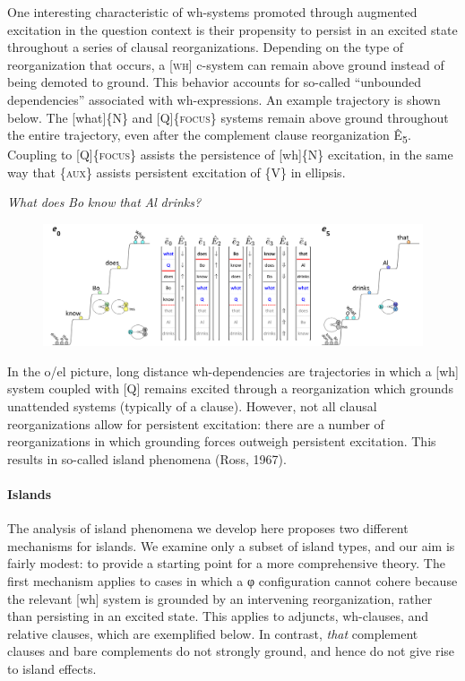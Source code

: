  One interesting characteristic of wh-systems promoted through augmented excitation in the question context is their propensity to persist in an excited state throughout a series of clausal reorganizations. Depending on the type of reorganization that occurs, a [\textsc{wh}] c-system can remain above ground instead of being demoted to ground. This behavior accounts for so-called “unbounded dependencies” associated with wh-expressions. An example trajectory is shown below. The [what]\{N\} and [Q]\{\textsc{focus}\} systems remain above ground throughout the entire trajectory, even after the complement clause reorganization Ê\textsubscript{5}. Coupling to  [Q]\{\textsc{focus}\} assists the persistence of [wh]\{N\} excitation, in the same way that \{\textsc{aux}\} assists persistent excitation of \{V\} in ellipsis. 

    \textit{What} \textit{does} \textit{Bo} \textit{know} \textit{that} \textit{Al} \textit{drinks?}

  
\begin{figure}
\includegraphics[width=\textwidth]{figures/Tilsen-img162.png}
\caption{\missingcaption}
\label{fig:}
\end{figure}
 

  In the o/el picture, long distance wh-dependencies are trajectories in which a [wh] system coupled with [Q] remains excited through a reorganization which grounds unattended systems (typically of a clause). However, not all clausal reorganizations allow for persistent excitation: there are a number of reorganizations in which grounding forces outweigh persistent excitation. This results in so-called island phenomena (Ross, 1967).

\paragraph{Islands}

The analysis of island phenomena we develop here proposes two different mechanisms for islands. We examine only a subset of island types, and our aim is fairly modest: to provide a starting point for a more comprehensive theory. The first mechanism applies to cases in which a φ configuration cannot cohere because the relevant [wh] system is grounded by an intervening reorganization, rather than persisting in an excited state. This applies to adjuncts, wh-clauses, and relative clauses, which are exemplified below. In contrast, \textit{that} complement clauses and bare complements do not strongly ground, and hence do not give rise to island effects.


